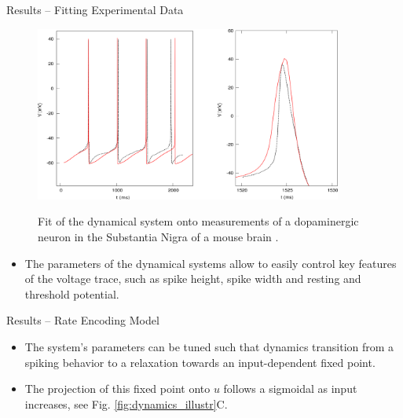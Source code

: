 \documentclass{beamer}
\begin{document}
\begin{frame}[t]
\begin{columns}
\begin{column}{.45\textwidth}
\begin{block}{Results -- Fitting Experimental Data}
\begin{figure}
\includegraphics[width=0.9\textwidth]{../figures/graphics/spikefit.png}
\label{fig:spikefit}
\caption{Fit of the dynamical system onto measurements of a dopaminergic
neuron in the Substantia Nigra of a mouse brain \cite{Bean_2007}.}
\end{figure}
\begin{itemize}
\item The parameters of the dynamical systems allow to easily control key features of the voltage trace, such as spike height, spike width and resting and threshold potential.
\end{itemize}
\end{block}

\begin{block}{Results -- Rate Encoding Model}
\begin{itemize}
\item The system's parameters can be tuned such that dynamics transition from a spiking behavior to a relaxation towards an input-dependent fixed point.
\item The projection of this fixed point onto $u$ follows a sigmoidal as input increases, see Fig. \ref{fig:dynamics_illustr}C. 
\end{itemize}

\end{block}




\end{column}
\end{columns}
\end{frame}
\end{document}
